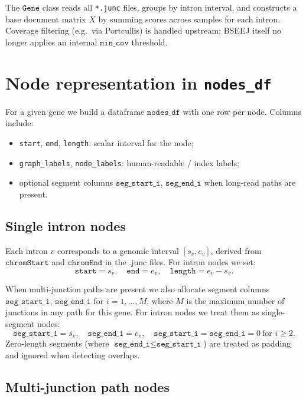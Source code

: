 \documentclass[11pt]{article}
\begin{document}
The \(\texttt{Gene}\) class reads all \texttt{*.junc} files, groups by intron
interval, and constructs a base document matrix \(X\) by summing scores across
samples for each intron. Coverage filtering (e.g.\ via Portcullis) is handled
upstream; BSEEJ itself no longer applies an internal \(\texttt{min\_cov}\)
threshold.

\section{Node representation in \texorpdfstring{\texttt{nodes\_df}}{nodes\_df}}

For a given gene we build a dataframe \(\texttt{nodes\_df}\) with one row per
node. Columns include:
\begin{itemize}
  \item \texttt{start}, \texttt{end}, \texttt{length}: scalar interval for
  the node;
  \item \texttt{graph\_labels}, \texttt{node\_labels}: human-readable / index
  labels;
  \item optional segment columns \(\texttt{seg\_start\_i}\),
  \(\texttt{seg\_end\_i}\) when long-read paths are present.
\end{itemize}

\subsection{Single intron nodes}

Each intron \(v\) corresponds to a genomic interval \([s_v,e_v]\), derived
from \(\texttt{chromStart}\) and \(\texttt{chromEnd}\) in the .junc files.
For intron nodes we set:
\[
  \texttt{start} = s_v,\quad \texttt{end} = e_v,\quad
  \texttt{length} = e_v - s_v.
\]

When multi-junction paths are present we also allocate segment columns
\(\texttt{seg\_start\_i}\), \(\texttt{seg\_end\_i}\) for
\(i = 1,\dots,M\), where \(M\) is the maximum number of junctions in any
path for this gene. For intron nodes we treat them as single-segment nodes:
\[
  \texttt{seg\_start\_1} = s_v,\quad \texttt{seg\_end\_1} = e_v,\quad
  \texttt{seg\_start\_i} = \texttt{seg\_end\_i} = 0 \ \text{for } i \ge 2.
\]
Zero-length segments (where \(\texttt{seg\_end\_i} \le \texttt{seg\_start\_i}\))
are treated as padding and ignored when detecting overlaps.

\subsection{Multi-junction path nodes}
\end{document}
